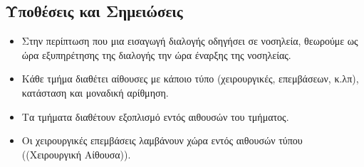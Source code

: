 \documentclass[13pt]{article}
\begin{document}
\subsection{Υποθέσεις και Σημειώσεις}
\begin{itemize}
\item 
    Στην περίπτωση που μια εισαγωγή διαλογής οδηγήσει σε νοσηλεία, θεωρούμε ως ώρα εξυπηρέτησης της διαλογής την ώρα έναρξης της νοσηλείας.
\item
    Κάθε τμήμα διαθέτει αίθουσες με κάποιο τύπο (χειρουργικές, επεμβάσεων, κ.λπ), κατάσταση και μοναδική αρίθμηση.
\item
    Τα τμήματα διαθέτουν εξοπλισμό εντός αιθουσών του τμήματος.
\item 
    Οι χειρουργικές επεμβάσεις λαμβάνουν χώρα εντός αιθουσών τύπου ((Χειρουργική Αίθουσα)).


\end{itemize}
\end{document}
